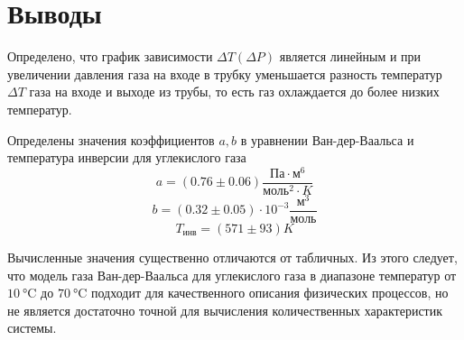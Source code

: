 \section{Выводы}

Определено, что график зависимости $\Delta T(\Delta P)$ является линейным и при увеличении давления газа на входе в трубку уменьшается разность температур $\Delta T$ газа на входе и выходе из трубы, то есть газ охлаждается до более низких температур.

Определены значения коэффициентов $a, b$ в уравнении Ван-дер-Ваальса и температура инверсии для углекислого газа
\[ a = (0.76 \pm 0.06) \frac{\text{Па}\cdot \text{м}^6}{\text{моль}^2\cdot K}\]
\[ b = (0.32 \pm 0.05)\cdot 10^{-3} \frac{\text{м}^3}{\text{моль}}\]
\[T_\text{инв} = (571 \pm 93)K\]

Вычисленные значения существенно отличаются от табличных. Из этого следует, что модель газа Ван-дер-Ваальса для углекислого газа в диапазоне температур от $\SI{10}{\celsius}$ до $\SI{70}{\celsius}$ подходит для качественного описания физических процессов, но не является достаточно точной для вычисления количественных характеристик системы.



